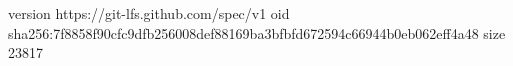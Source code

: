 version https://git-lfs.github.com/spec/v1
oid sha256:7f8858f90cfc9dfb256008def88169ba3bfbfd672594c66944b0eb062eff4a48
size 23817
